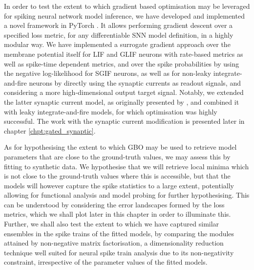 \documentclass[mphil,deptreport,ianc]{infthesis} %
\begin{document}
In order to test the extent to which gradient based optimisation may be leveraged for spiking neural network model inference, we have developed and implemented a novel framework in PyTorch \cite{Paszke2017, Paszke2019}.
It allows performing gradient descent over a specified loss metric, for any differentiable SNN model definition, in a highly modular way.
We have implemented a surrogate gradient approach over the membrane potential itself for LIF and GLIF neurons with rate-based metrics as well as spike-time dependent metrics, and over the spike probabilities by using the negative log-likelihood for SGIF neurons, as well as for non-leaky integrate-and-fire neurons by directly using the synaptic currents as readout signals, and considering a more high-dimensional output target signal.
Notably, we extended the latter synaptic current model, as originally presented by \cite{Huh2017}, and combined it with leaky integrate-and-fire models, for which optimisation was highly successful. The work with the synaptic current modification is presented later in chapter \ref{chpt:gated_synaptic}.

As for hypothesising the extent to which GBO may be used to retrieve model parameters that are close to the ground-truth values, we may assess this by fitting to synthetic data.
We hypothesise that we will retrieve local minima which is not close to the ground-truth values where this is accessible, but that the models will however capture the spike statistics to a large extent, potentially allowing for functional analysis and model probing for further hypothesising. 
This can be understood by considering the error landscapes formed by the loss metrics, which we shall plot later in this chapter in order to illuminate this.
Further, we shall also test the extent to which we have captured similar ensembles in the spike trains of the fitted models, by comparing the modules attained by non-negative matrix factorisation, a dimensionality reduction technique well suited for neural spike train analysis due to its non-negativity constraint, irrespective of the parameter values of the fitted models.
\end{document}

